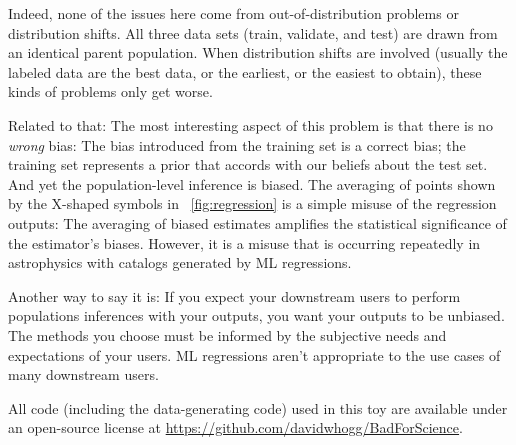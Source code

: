\documentclass{article}
\newcommand{\figref}[1]{\figurename~\ref{#1}}
\begin{document}
Indeed, none of the issues here come from out-of-distribution problems or distribution shifts.
All three data sets (train, validate, and test) are drawn from an identical parent population.
When distribution shifts are involved (usually the labeled data are the best data, or the earliest, or the easiest to obtain), these kinds of problems only get worse.

Related to that: The most interesting aspect of this problem is that there is no \emph{wrong} bias:
The bias introduced from the training set is a correct bias; the training set represents a prior that accords with our beliefs about the test set.
And yet the population-level inference is biased.
The averaging of points shown by the X-shaped symbols in \figref{fig:regression} is a simple misuse of the regression outputs:
The averaging of biased estimates amplifies the statistical significance of the estimator's biases.
However, it is a misuse that is occurring repeatedly in astrophysics with catalogs generated by ML regressions.

Another way to say it is:
If you expect your downstream users to perform populations inferences with your outputs, you want your outputs to be unbiased.
The methods you choose must be informed by the subjective needs and expectations of your users.
ML regressions aren't appropriate to the use cases of many downstream users.

All code (including the data-generating code) used in this toy are available under an open-source license at 
\url{https://github.com/davidwhogg/BadForScience}.
\end{document}

